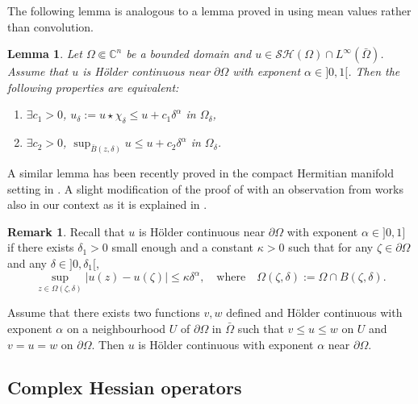 \documentclass[11pt]{article}
\providecommand{\C}{}
\numberwithin{equation}{section}
\newenvironment{enumeratei}
{\bgroup\def\theenumi{\roman{enumi}}\def\theenumii{\arabic{enumii}}\begin{enumerate}}
{\end{enumerate}\egroup}
\newtheorem{lemma}[theorem]{Lemma}
\theoremstyle{definition}
\newtheorem{remark}[theorem]{Remark}
\renewcommand{\C}{\mathbb{C}}
\theoremstyle{plain}
\theoremstyle{definition}
\begin{document}
The following lemma is analogous to a lemma proved in \cite{GKZ08} using mean values rather than convolution.
\begin{lemma} \label{lem:sup-mean} Let $\Omega \Subset \C^n$ be a bounded domain and $u \in \mathcal{SH} (\Omega) \cap L^{\infty} ({\bar \Omega})$. Assume that $u$ is Hölder continuous near $\partial\Omega$ with exponent $\alpha \in{} ]0,1[$. Then the following properties are equivalent:
\begin{enumeratei}
\item
$\exists c_1 >0$, ${ u}_\delta:= u \star \chi_\delta \leq u + c_1 \delta^{\alpha}$ in $\Omega_\delta$,

\item
$\exists c_2 >0$, $\sup_{\bar B(z,\delta)} u \leq u + c_2 \delta^{\alpha}$ in $\Omega_\delta$.
\end{enumeratei}
\end{lemma}
A similar lemma has been recently proved in the compact Hermitian manifold setting in \cite{LPT20}.
A slight modification of the proof of \cite{GKZ08} with an observation from \cite{LPT20} works also in our context as it is explained in \cite{Ze20}.

\begin{remark} \label{rem:HolderBoundary} Recall that $u$ is Hölder continuous near $\partial\Omega$ with exponent $\alpha \in{}]0,1]$ if there exists $\delta_1 > 0$ small enough and a constant $\kappa > 0$ such that for any $\zeta \in \partial \Omega$ and any $\delta\in{}]0,\delta_1[$,
\[
\sup_{z \in \Omega (\zeta,\delta)} \vert u (z) - u (\zeta) \vert \leq \kappa \delta^\alpha, \quad\text{where}\quad \Omega(\zeta,\delta):= \Omega \cap B (\zeta,\delta).
\]

Assume that there exists two functions $v, w $ defined and Hölder continuous with exponent $\alpha $ on a neighbourhood $ U$ of $\partial \Omega$ in $\bar \Omega$ such that
$v \leq u \leq w$ on $ U$ and $v = u = w$ on $\partial \Omega$. Then $u$ is Hölder continuous with exponent $\alpha $ near $\partial \Omega$.
\end{remark}

\subsection{Complex Hessian operators}
\end{document}
